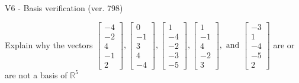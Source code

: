 \begin{exercise}
  \begin{exerciseTitle}V6 - Basis verification (ver. 798)\end{exerciseTitle}
  \begin{exerciseStatement}
    Explain why the vectors \(\left[\begin{array}{r}
-4 \\
-2 \\
4 \\
-1 \\
2
\end{array}\right] , \left[\begin{array}{r}
0 \\
-1 \\
3 \\
4 \\
-4
\end{array}\right] , \left[\begin{array}{r}
1 \\
-4 \\
-2 \\
-3 \\
-5
\end{array}\right] , \left[\begin{array}{r}
1 \\
-1 \\
4 \\
-2 \\
3
\end{array}\right] , \text{ and } \left[\begin{array}{r}
-3 \\
1 \\
-4 \\
-5 \\
2
\end{array}\right]\) are or are not a basis of \(\mathbb{R}^5\)	



\end{exerciseStatement}
\end{exercise}
